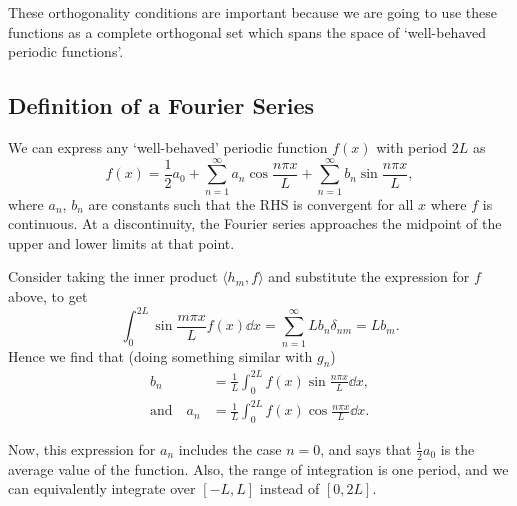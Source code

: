\documentclass[a4paper]{scrartcl}
\begin{document}
These orthogonality conditions are important because we are going to use these functions as a complete orthogonal set which spans the space of `well-behaved periodic functions'.


\subsection{Definition of a Fourier Series}

We can express any `well-behaved' periodic function $f(x)$ with period $2L$ as
$$
f(x)=\frac{1}{2} a_{0}+\sum_{n=1}^{\infty} a_{n} \cos \frac{n \pi x}{L}+\sum_{n=1}^{\infty} b_{n} \sin \frac{n \pi x}{L},
$$
where $a_n$, $b_n$ are constants such that the RHS is convergent for all $x$ where $f$ is continuous. At a discontinuity, the Fourier series approaches the midpoint of the upper and lower limits at that point.

Consider taking the inner product $\langle h_m, f\rangle$ and substitute the expression for $f$ above, to get
$$
   \int_0^{2L} \sin \frac{m\pi x}{L} f(x) \dd x = \sum_{n = 1}^{\infty} L b_n \delta_{nm} = Lb_m.
$$
Hence we find that (doing something similar with $g_n$)
\begin{align*}
   b_n &= \frac{1}{L}\int_0^{2L} f(x) \sin \frac{n \pi x}{L} \dd x, \\
    \text{and} \quad a_n &= \frac{1}{L}\int_0^{2L} f(x) \cos \frac{n \pi x}{L} \dd x.
\end{align*}

Now, this expression for $a_n$ includes the case $n = 0$, and says that $\frac{1}{2}a_0$ is the average value of the function. Also, the range of integration is one period, and we can equivalently integrate over $[-L, L]$ instead of $[0, 2L]$.
\end{document}
